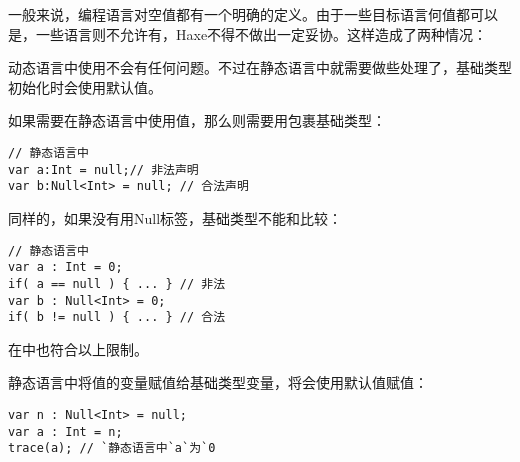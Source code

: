 一般来说，编程语言对空值都有一个明确的定义。由于一些目标语言何值都可以是，一些语言则不允许有，Haxe不得不做出一定妥协。这样造成了两种情况：



动态语言中使用不会有任何问题。不过在静态语言中就需要做些处理了，基础类型初始化时会使用默认值。


如果需要在静态语言中使用值，那么则需要用包裹基础类型：

\begin{lstlisting}
// 静态语言中
var a:Int = null;// 非法声明
var b:Null<Int> = null; // 合法声明
\end{lstlisting}

同样的，如果没有用Null标签，基础类型不能和比较：

\begin{lstlisting}
// 静态语言中
var a : Int = 0;
if( a == null ) { ... } // 非法
var b : Null<Int> = 0;
if( b != null ) { ... } // 合法
\end{lstlisting}

在中也符合以上限制。


静态语言中将值的变量赋值给基础类型变量，将会使用默认值赋值：

\begin{lstlisting}
var n : Null<Int> = null;
var a : Int = n;
trace(a); // `静态语言中`a`为`0
\end{lstlisting}

